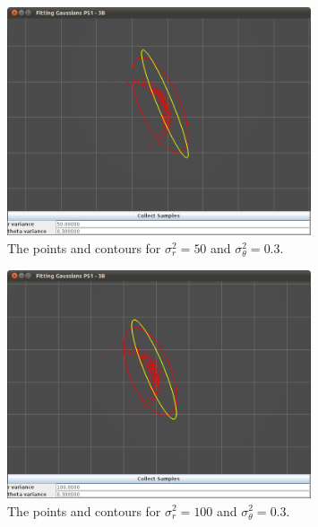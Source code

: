 \documentclass[12pt]{article}
\begin{document}
\begin{figure}
\centering
\includegraphics[width=0.8\textwidth]{figures/GaussianFit_50_0_3.png}
\caption{The points and contours for $\sigma^2_r=50$ and $\sigma^2_\theta=0.3$.}
\label{fig:covplot_50_30}
\end{figure}

\begin{figure}
\centering
\includegraphics[width=0.8\textwidth]{figures/GaussianFit_100_0_3.png}
\caption{The points and contours for $\sigma^2_r=100$ and $\sigma^2_\theta=0.3$.}
\label{fig:covplot_100_30}
\end{figure}


\end{document}
